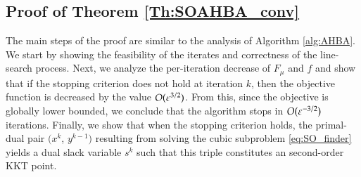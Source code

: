 %




\subsection{Proof of Theorem \ref{Th:SOAHBA_conv}}
\label{sec:ProofSOM}
The main steps of the proof are similar to the analysis of Algorithm \ref{alg:AHBA}. We start by showing the feasibility of the iterates and correctness of the line-search process. Next, we analyze the per-iteration decrease of $F_{\mu}$ and $f$ and show that if the stopping criterion does not hold at iteration $k$, then the objective function is decreased by the value $O(\varepsilon^{3/2})$. From this, since the objective is globally lower bounded, we conclude that the algorithm stops in  $O(\varepsilon^{-3/2})$ iterations. Finally, we show that when the stopping criterion holds, the primal-dual pair $(x^{k}$, $y^{k-1})$ resulting from solving the cubic subproblem \eqref{eq:SO_finder} yields a dual slack variable $s^{k}$ such that this triple constitutes an second-order KKT point. 

